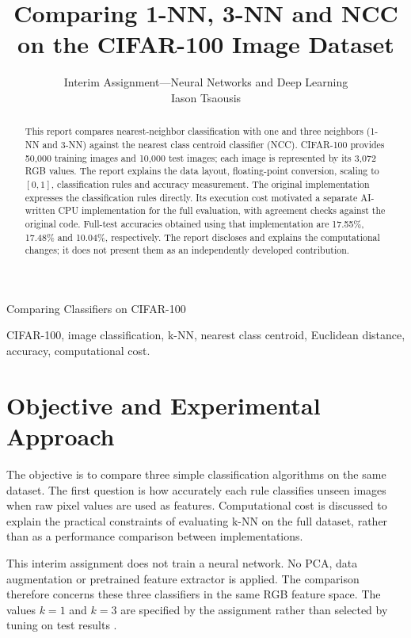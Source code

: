 \documentclass[letterpaper,journal]{IEEEtran}
\begin{document}
\title{Comparing 1-NN, 3-NN and NCC\\on the CIFAR-100 Image Dataset}
\author{Interim Assignment---Neural Networks and Deep Learning\\
Iason Tsaousis}
%
{Comparing Classifiers on CIFAR-100}
\maketitle

\begin{abstract}
This report compares nearest-neighbor classification with one and three
neighbors (1-NN and 3-NN) against the nearest class centroid classifier (NCC).
CIFAR-100 provides 50,000 training images and 10,000 test images; each image
is represented by its 3,072 RGB values. The report explains the data layout,
floating-point conversion, scaling to $[0,1]$, classification rules and accuracy
measurement. The original implementation expresses the classification rules
directly. Its execution cost motivated a separate AI-written CPU implementation
for the full evaluation, with agreement checks against the original code.
Full-test accuracies obtained using that implementation are 17.55\%, 17.48\%
and 10.04\%, respectively. The report discloses and explains the computational
changes; it does not present them as an independently developed contribution.
\end{abstract}

\begin{IEEEkeywords}
CIFAR-100, image classification, k-NN, nearest class centroid, Euclidean
distance, accuracy, computational cost.
\end{IEEEkeywords}

\section{Objective and Experimental Approach}
The objective is to compare three simple classification algorithms on the same
dataset. The first question is how accurately each rule classifies unseen
images when raw pixel values are used as features. Computational cost is
discussed to explain the practical constraints of evaluating k-NN on the full
dataset, rather than as a performance comparison between implementations.

This interim assignment does not train a neural network. No PCA, data
augmentation or pretrained feature extractor is applied. The comparison
therefore concerns these three classifiers in the same RGB feature space.
The values $k=1$ and $k=3$ are specified by the assignment rather than selected
by tuning on test results \cite{assignment}.
\end{document}
